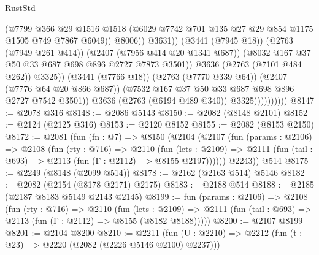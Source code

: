 \begin{lexlean}{RustStd}
\begin{coremodule}
                                        (@7799
                                          @366
                                          @29
                                          @1516
                                          @1518
                                          (@6029
                                            @7742
                                            @701
                                            @135
                                            @27
                                            @29
                                            @854
                                            @1175
                                            @1505
                                            @749
                                            @7867
                                            @6049))
                                        @8006))
                                    @3631))
                                (@3441 (@7945 @18))
                                (@2763 (@7949 @261 @414))
                                (@2407 (@7956 @414 @20 @1341 @687))
                                (@8032 @167 @37 @50 @33 @687 @698 @896 @2727 @7873 @3501))
                              @3636
                              (@2763 (@7101 @484 @262))
                              @3325))
                          (@3441 (@7766 @18))
                          (@2763 (@7770 @339 @64))
                          (@2407 (@7776 @64 @20 @866 @687))
                          (@7532 @167 @37 @50 @33 @687 @698 @896 @2727 @7542 @3501))
                        @3636
                        (@2763 (@6194 @489 @340))
                        @3325))))))))))
@8147 := @2078 @316
@8148 := @2086 @5143
@8150 := @2082 (@8148 @2101)
@8152 := @2124 (@2125 @316)
@8153 := @2120 @8152
@8155 := @2082 (@8153 @2150)
@8172 := @2081
    (fun (fn : @7) =>
    @8150
      (@2104
        (@2107
          (fun (params : @2106) =>
          @2108
            (fun (rty : @716) =>
            @2110
              (fun (lets : @2109) =>
              @2111 (fun (tail : @693) => @2113 (fun (Γ : @2112) => @8155 @2197))))))
        @2243))
    @514
@8175 := @2249 (@8148 (@2099 @514))
@8178 := @2162 (@2163 @514) @5146
@8182 := @2082 (@2154 (@8178 @2171) @2175)
@8183 := @2188 @514
@8188 := @2185 (@2187 @8183 @5149 @2143 @2145)
@8199 := fun (params : @2106) =>
  @2108
    (fun (rty : @716) =>
    @2110
      (fun (lets : @2109) =>
      @2111 (fun (tail : @693) => @2113 (fun (Γ : @2112) => @8155 (@8182 @8188)))))
@8200 := @2107 @8199
@8201 := @2104 @8200
@8210 := @2211 (fun (U : @2210) => @2212 (fun (t : @23) => @2220 (@2082 (@2226 @5146 @2100) @2237)))

\end{coremodule}
\end{lexlean}
